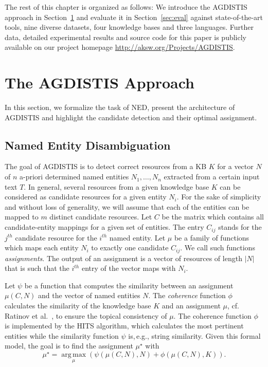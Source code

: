 The rest of this chapter is organized as follows: 
We introduce the AGDISTIS approach in Section~\ref{sec:approach} and evaluate it in Section~\ref{sec:eval} against state-of-the-art tools, nine diverse datasets, four knowledge bases and three languages. 
Further data, detailed experimental results and source code for this paper is publicly available on our project homepage \url{http://aksw.org/Projects/AGDISTIS}.

\section{The AGDISTIS Approach} 
\label{sec:approach}

In this section, we formalize the task of \ac{NED}, present the architecture of AGDISTIS and highlight the candidate detection and their optimal assignment. 

\subsection{Named Entity Disambiguation}
\label{sec:ned}

The goal of AGDISTIS is to detect correct resources from a \ac{KB} $K$ for a vector $N$ of $n$ a-priori determined named entities $N_1,\ldots,N_n$ extracted from a certain input text $T$.
In general, several resources from a given knowledge base $K$ can be considered as candidate resources for a given entity $N_i$.
For the sake of simplicity and without loss of generality, we will assume that each of the entities can be mapped to $m$ distinct candidate resources.
Let $C$ be the matrix which contains all candidate-entity mappings for a given set of entities.
The entry $C_{ij}$ stands for the $j^{th}$ candidate resource for the $i^{th}$ named entity. 
Let $\mu$ be a family of functions which maps each entity $N_i$ to exactly one candidate $C_{ij}$. 
We call such functions \emph{assignments}.
The output of an assignment is a vector of resources of length $|N|$ that is such that the $i^{th}$ entry of the vector maps with $N_i$.

Let $\psi$ be a function that computes the similarity between an assignment $\mu(C,N)$ and the vector of named entities $N$.
The \emph{coherence} function $\phi$ calculates the similarity of the knowledge base $K$ and an assignment $\mu$, cf. Ratinov et al.~\cite{rat:rot}, to ensure the topical consistency of $\mu$.
The coherence function $\phi$ is implemented by the  \ac{HITS} algorithm, which calculates the most pertinent entities while the similarity function $\psi$ is,\,e.g., string similarity.
Given this formal model, the goal is to find the assignment $\mu^\star$ with
\begin{equation*}
\mu^\star= \operatorname*{arg\,max}\limits_{\mu}\left(\psi(\mu(C,N), N) + \phi(\mu(C,N),K)\right).
\end{equation*}

